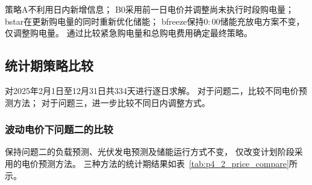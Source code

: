 \begin{table}[H]
\centering
\caption{波动电价下不同滚动购电策略设置}
\label{tab:p4_3_strategy}
\end{table}

策略A不利用日内新增信息；
B0采用前一日电价并调整尚未执行时段购电量；
bstar在更新购电量的同时重新优化储能；
bfreeze保持$0{:}00$储能充放电方案不变，仅调整购电量。
通过比较紧急购电量和总购电费用确定最终策略。


\subsection{统计期策略比较}

对2025年2月1日至12月31日共334天进行逐日求解。
对于问题二，比较不同电价预测方法；
对于问题三，进一步比较不同日内调整方式。


\subsubsection{波动电价下问题二的比较}

保持问题二的负载预测、光伏发电预测及储能运行方式不变，
仅改变计划阶段采用的电价预测方法。
三种方法的统计期结果如表~\ref{tab:p4_2_price_compare}所示。

